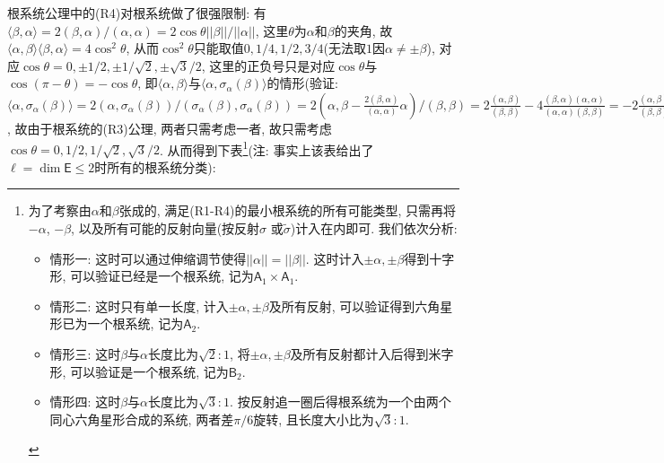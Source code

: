 \documentclass{ctexart}%
\theoremstyle{definition}
\theoremstyle{remark}
\begin{document}
根系统公理中的(R4)对根系统做了很强限制: 有$\langle \beta,\alpha\rangle = 2(\beta,\alpha)/(\alpha,\alpha)= 2\cos \theta||\beta||/||\alpha||$, 这里$\theta$为$\alpha$和$\beta$的夹角, 故$\langle \alpha,\beta\rangle\langle\beta,\alpha\rangle = 4 \cos^2\theta$, 从而$\cos^2\theta$只能取值$0,1/4,1/2,3/4$(无法取$1$因$\alpha \neq \pm \beta$), 对应$\cos \theta=0,\pm1/2,\pm1/\sqrt{2},\pm \sqrt{3}/2$, 这里的正负号只是对应$\cos \theta$与$\cos(\pi-\theta)=-\cos\theta$, 即$\langle \alpha,\beta\rangle$与$\langle \alpha,\sigma_\alpha(\beta)\rangle$的情形(验证: $\langle \alpha,\sigma_\alpha(\beta)\rangle
=  2(\alpha, \sigma_\alpha(\beta))/(\sigma_\alpha(\beta),\sigma_\alpha(\beta)) =
2(\alpha,\beta-\frac{2(\beta,\alpha)}{(\alpha,\alpha)}\alpha)/(\beta,\beta)
= 2\frac{(\alpha,\beta)}{(\beta,\beta)}-4\frac{(\beta,\alpha)(\alpha,\alpha)}{(\alpha,\alpha)(\beta,\beta)}=-2\frac{(\alpha,\beta)}{(\beta,\beta)} = -\langle \alpha, \beta\rangle$, 故由于根系统的(R3)公理, 两者只需考虑一者, 故只需考虑$\cos\theta=0,1/2,1/\sqrt{2},\sqrt{3}/2$. 从而得到下表\footnote{为了考察由$\alpha$和$\beta$张成的, 满足(R1-R4)的最小根系统的所有可能类型, 只需再将$-\alpha$, $-\beta$, 以及所有可能的反射向量(按反射$\sigma$ 或$\widetilde{\sigma}$)计入在内即可. 我们依次分析:
\begin{itemize}
\item 情形一: 这时可以通过伸缩调节使得$||\alpha||=||\beta||$. 这时计入$\pm \alpha,\pm \beta$得到十字形, 可以验证已经是一个根系统, 记为$\mathsf{A}_1\times \mathsf{A}_1$.
\item 情形二: 这时只有单一长度, 计入$\pm \alpha, \pm\beta$及所有反射, 可以验证得到六角星形已为一个根系统, 记为$\mathsf{A}_2$.
\item 情形三: 这时$\beta$与$\alpha$长度比为$\sqrt{2}:1$, 将$\pm \alpha, \pm \beta$及所有反射都计入后得到米字形, 可以验证是一个根系统, 记为$\mathsf{B}_2$.
\item 情形四: 这时$\beta$与$\alpha$长度比为$\sqrt{3}:1$. 按反射追一圈后得根系统为一个由两个同心六角星形合成的系统, 两者差$\pi/6$旋转, 且长度大小比为$\sqrt{3}:1$.
\end{itemize}}(注: 事实上该表给出了$\ell=\dim \mathsf{E}\leq 2$时所有的根系统分类):
\end{document}
